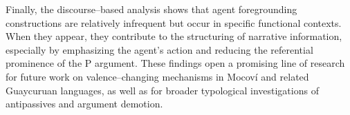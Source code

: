 \documentclass[12pt]{article}
\begin{document}
Finally, the discourse--based analysis shows that agent foregrounding constructions are relatively infrequent but occur in specific functional contexts. When they appear, they contribute to the structuring of narrative information, especially by emphasizing the agent’s action and reducing the referential prominence of the P argument. These findings open a promising line of research for future work on valence--changing mechanisms in Mocoví and related Guaycuruan languages, as well as for broader typological investigations of antipassives and argument demotion.

\end{document}
